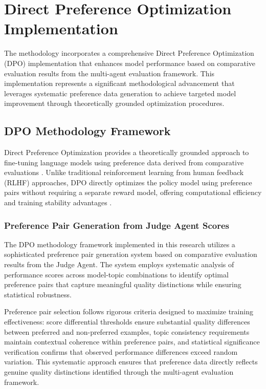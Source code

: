 \section{Direct Preference Optimization Implementation}
\label{sec:dpo-implementation}

The methodology incorporates a comprehensive Direct Preference Optimization (DPO) implementation that enhances model performance based on comparative evaluation results from the multi-agent evaluation framework. This implementation represents a significant methodological advancement that leverages systematic preference data generation to achieve targeted model improvement through theoretically grounded optimization procedures.

\subsection{DPO Methodology Framework}

Direct Preference Optimization provides a theoretically grounded approach to fine-tuning language models using preference data derived from comparative evaluations \cite{rafailov2023dpo, muldrew2024active_preference}. Unlike traditional reinforcement learning from human feedback (RLHF) approaches, DPO directly optimizes the policy model using preference pairs without requiring a separate reward model, offering computational efficiency and training stability advantages \cite{wang2024asft}.

\subsubsection{Preference Pair Generation from Judge Agent Scores}

The DPO methodology framework implemented in this research utilizes a sophisticated preference pair generation system based on comparative evaluation results from the Judge Agent. The system employs systematic analysis of performance scores across model-topic combinations to identify optimal preference pairs that capture meaningful quality distinctions while ensuring statistical robustness.

Preference pair selection follows rigorous criteria designed to maximize training effectiveness: score differential thresholds ensure substantial quality differences between preferred and non-preferred examples, topic consistency requirements maintain contextual coherence within preference pairs, and statistical significance verification confirms that observed performance differences exceed random variation. This systematic approach ensures that preference data directly reflects genuine quality distinctions identified through the multi-agent evaluation framework.

